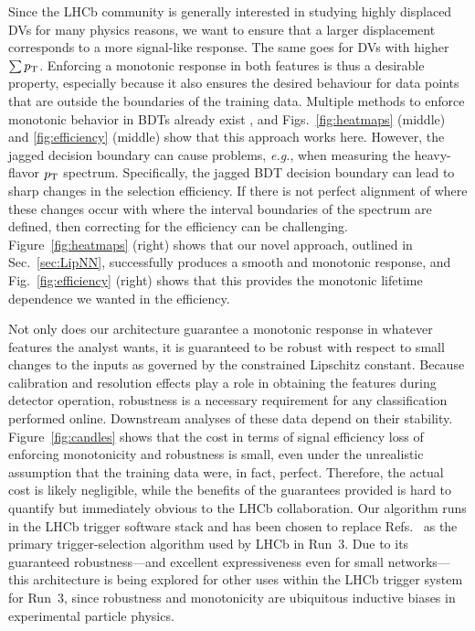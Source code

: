 \documentclass{article}
\begin{document}
Since the LHCb community is generally interested in studying highly displaced DVs for many physics reasons,  
we want to ensure that a larger displacement corresponds to a more signal-like response.
The same goes for DVs with higher $\sum p_{\rm T}$. 
Enforcing a monotonic response in both features is thus a desirable property, especially because it also ensures the desired
behaviour for data points that are outside the boundaries of the training data.
Multiple methods to enforce monotonic behavior in BDTs already exist \cite{auguste2020better}, and Figs.~\ref{fig:heatmaps} (middle) and \ref{fig:efficiency} (middle) show that this approach works here.
However, the jagged decision boundary can cause problems, {\em e.g.}, when measuring the heavy-flavor $p_{\rm T}$ spectrum. 
Specifically, the jagged BDT decision boundary can lead to sharp changes in the selection efficiency. If there is not perfect alignment of where these changes occur with where the interval boundaries of the spectrum are defined, then correcting for the efficiency can be challenging.
Figure~\ref{fig:heatmaps} (right) shows that our novel approach, outlined in Sec.~\ref{sec:LipNN}, successfully produces a smooth and monotonic response, and Fig.~\ref{fig:efficiency} (right) shows that this provides the monotonic lifetime dependence we wanted in the efficiency. 

Not only does
our architecture guarantee a monotonic response in whatever features the analyst wants, it 
is guaranteed to be robust with respect to
small changes to the inputs as governed by the constrained Lipschitz constant.
Because calibration and resolution effects play a role in obtaining the features during
detector operation, robustness is a necessary requirement for any classification
performed online. 
Downstream analyses of these data depend on their stability.
Figure~\ref{fig:candles} shows that the cost in terms of signal efficiency loss of enforcing monotonicity and robustness is small, even under the unrealistic assumption that the training data were, in fact, perfect. Therefore, the actual cost is likely negligible, while the benefits of the guarantees provided is hard to quantify but immediately obvious to the LHCb collaboration.  
Our algorithm runs in the LHCb trigger software stack and has been chosen to replace Refs.~\cite{BBDT,LHCb-PROC-2015-018} as the primary trigger-selection algorithm used by LHCb in Run~3. 
Due to its guaranteed robustness---and excellent expressiveness even for small networks---this architecture is being explored for other uses within the LHCb trigger system for Run~3, since robustness and monotonicity are ubiquitous inductive biases in experimental particle physics. 
\end{document}
